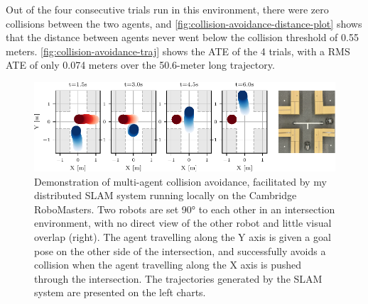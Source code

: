 Out of the four consecutive trials run in this environment, there were zero collisions between the two agents, and \autoref{fig:collision-avoidance-distance-plot} shows that the distance between agents never went below the collision threshold of 0.55 meters. \autoref{fig:collision-avoidance-traj} shows the ATE of the 4 trials, with a RMS ATE of only 0.074 meters over the 50.6-meter long trajectory.


\begin{figure}[h]
    \centering
    \includegraphics[width=\linewidth]{figures/mar25_1_tracer_graph.pdf}

    \caption{Demonstration of multi-agent collision avoidance, facilitated by my distributed SLAM system running locally on the Cambridge RoboMasters. Two robots are set 90° to each other in an intersection environment, with no direct view of the other robot and little visual overlap (right). The agent travelling along the Y axis is given a goal pose on the other side of the intersection, and successfully avoids a collision when the agent travelling along the X axis is pushed through the intersection. The trajectories generated by the SLAM system are presented on the left charts.}
    \label{fig:collision-avoidance}
\end{figure}

